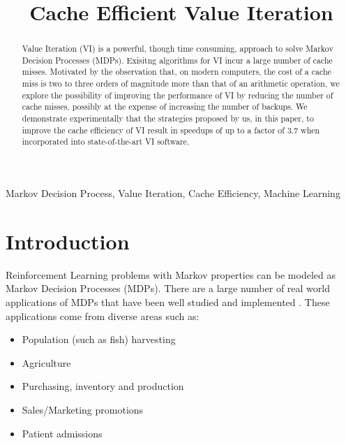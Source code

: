 \documentclass[conference]{IEEEtran}
\begin{document}
\title{Cache Efficient Value Iteration\\
}

\author{
\and
{}
}

\maketitle

\begin{abstract}
Value Iteration (VI) is a powerful, though time consuming, approach
to solve Markov Decision Processes (MDPs). Exisitng algorithms for VI incur a large number of cache misses. Motivated by the observation that,
on modern computers, the cost of a
cache miss is two to three orders of magnitude more than that of an arithmetic
operation, we explore the possibility of improving the performance of VI
by reducing the number of cache misses, possibly at the expense of increasing
the number of backups.
We demonstrate experimentally that the strategies proposed by us, in this paper,
to improve the cache efficiency of VI result in speedups of up to a factor of 3.7
when incorporated into state-of-the-art VI software.
\end{abstract}

\begin{IEEEkeywords}
Markov Decision Process, Value Iteration, Cache Efficiency, Machine Learning
\end{IEEEkeywords}

\section{Introduction}
\label{Intro}
Reinforcement Learning problems with Markov properties can be modeled as Markov Decision Processes (MDPs). There are a large number of real world applications of MDPs that have been well studied and implemented \cite{b8}.
These applications come from diverse areas such as: 
\begin{itemize}
\item Population (such as fish) harvesting
\item Agriculture
\item Purchasing, inventory and production
\item Sales/Marketing promotions
\item Patient admissions
\end{itemize}
\end{document}
